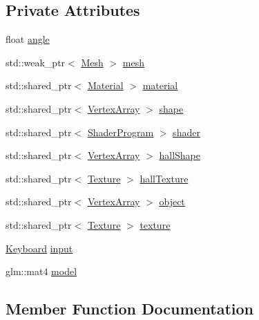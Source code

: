 \subsection*{Private Attributes}
\begin{DoxyCompactItemize}
\item 
float \hyperlink{classtmsengine_1_1_mesh_renderer_aed43f36a26f4ab4fffad978f7efbcca1}{angle}
\item 
std\+::weak\+\_\+ptr$<$ \hyperlink{class_mesh}{Mesh} $>$ \hyperlink{classtmsengine_1_1_mesh_renderer_a6bc03b9b7e038a6e498fe7d54323d94e}{mesh}
\item 
std\+::shared\+\_\+ptr$<$ \hyperlink{class_material}{Material} $>$ \hyperlink{classtmsengine_1_1_mesh_renderer_ae9c9e481c73462163839fe0fccbc7de7}{material}
\item 
std\+::shared\+\_\+ptr$<$ \hyperlink{classtmsengine_1_1_vertex_array}{Vertex\+Array} $>$ \hyperlink{classtmsengine_1_1_mesh_renderer_a06a3739c8ec10c3e8beeea648701250a}{shape}
\item 
std\+::shared\+\_\+ptr$<$ \hyperlink{classtmsengine_1_1_shader_program}{Shader\+Program} $>$ \hyperlink{classtmsengine_1_1_mesh_renderer_aa303774109b5a5ca7c3ef0d10cea4508}{shader}
\item 
std\+::shared\+\_\+ptr$<$ \hyperlink{classtmsengine_1_1_vertex_array}{Vertex\+Array} $>$ \hyperlink{classtmsengine_1_1_mesh_renderer_aef537847320f1f0e6227f0e599f8b317}{hall\+Shape}
\item 
std\+::shared\+\_\+ptr$<$ \hyperlink{classtmsengine_1_1_texture}{Texture} $>$ \hyperlink{classtmsengine_1_1_mesh_renderer_adfb1c4c403365aaca511cce9c8533244}{hall\+Texture}
\item 
std\+::shared\+\_\+ptr$<$ \hyperlink{classtmsengine_1_1_vertex_array}{Vertex\+Array} $>$ \hyperlink{classtmsengine_1_1_mesh_renderer_a018cd9669b1d0fa770102fd9ec3c24e6}{object}
\item 
std\+::shared\+\_\+ptr$<$ \hyperlink{classtmsengine_1_1_texture}{Texture} $>$ \hyperlink{classtmsengine_1_1_mesh_renderer_aef2386e714dd2dfc616dc2249bc60d67}{texture}
\item 
\hyperlink{classtmsengine_1_1_keyboard}{Keyboard} \hyperlink{classtmsengine_1_1_mesh_renderer_a572d3dc4c4211c1d93645616b3ae26c7}{input}
\item 
glm\+::mat4 \hyperlink{classtmsengine_1_1_mesh_renderer_abac4546c1d1fa1144d88e0e11824b96a}{model}
\end{DoxyCompactItemize}


\subsection{Member Function Documentation}
\mbox{\label{classtmsengine_1_1_mesh_renderer_a0d609c998a9c37b9282639432b165788}} 
